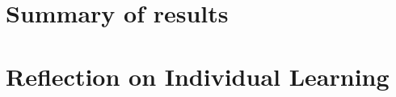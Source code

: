 \documentclass[12pt]{report}
\begin{document}
\section{Summary of results} 

\section{Reflection on Individual Learning}


\printbibliography
\end{document}
